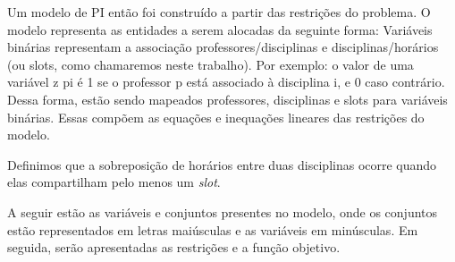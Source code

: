 Um modelo de PI então foi construído a partir das restrições do problema. O modelo representa as entidades a serem alocadas da seguinte forma: Variáveis binárias representam a associação professores/disciplinas e disciplinas/horários (ou slots, como chamaremos neste trabalho). Por exemplo: o valor de uma variável z pi é 1 se o professor p está associado à disciplina i, e 0 caso contrário. Dessa forma, estão sendo mapeados professores, disciplinas e slots para variáveis binárias. Essas compõem as equações e inequações lineares das restrições do modelo.

Definimos que a sobreposição de horários entre duas disciplinas ocorre quando elas compartilham pelo menos um \textit{slot}.

A seguir estão as variáveis e conjuntos presentes no modelo, onde os conjuntos estão representados em letras maiúsculas e as variáveis em minúsculas. Em seguida, serão apresentadas as restrições e a função objetivo.

